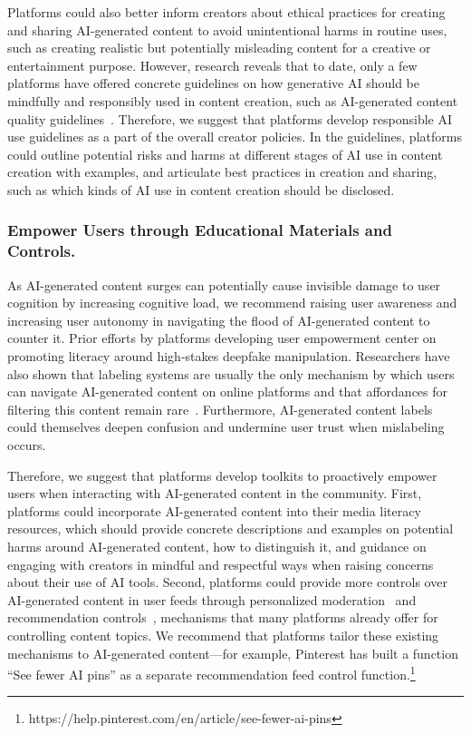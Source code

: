 Platforms could also better inform creators about ethical practices for creating and sharing AI-generated content to avoid unintentional harms in routine uses, such as creating realistic but potentially misleading content for a creative or entertainment purpose. %
However, research reveals that to date, only a few platforms have offered concrete guidelines on how generative AI should be mindfully and responsibly used in content creation, such as AI-generated content quality guidelines~\cite{gao2026governance}. Therefore, we suggest that platforms develop responsible AI use guidelines as a part of the overall creator policies. In the guidelines, platforms could outline potential risks and harms at different stages of AI use in content creation with examples, and articulate best practices in creation and sharing, such as which kinds of AI use in content creation should be disclosed.


\subsubsection{Empower Users through Educational Materials and Controls.} As AI-generated content surges can potentially cause invisible damage to user cognition by increasing cognitive load, we recommend raising user awareness and increasing user autonomy in navigating the flood of AI-generated content to counter it. Prior efforts by platforms developing user empowerment center on promoting literacy around high-stakes deepfake manipulation. Researchers have also shown that labeling systems are usually the only mechanism by which users can navigate AI-generated content on online platforms and that affordances for filtering this content remain rare~\cite{gao2026governance}. Furthermore, AI-generated content labels could themselves deepen confusion and undermine user trust when mislabeling occurs.

Therefore, we suggest that platforms develop toolkits to proactively empower users when interacting with AI-generated content in the community. First, platforms could incorporate AI-generated content into their media literacy resources, which should provide concrete descriptions and examples on potential harms around AI-generated content, how to distinguish it, and guidance on engaging with creators in mindful and respectful ways when raising concerns about their use of AI tools. Second, platforms could provide more controls over AI-generated content in user feeds through personalized moderation~\cite{jhaver2023personalizing} and recommendation controls~\cite{li2025beyond}, mechanisms that many platforms already offer for controlling content topics. We recommend that platforms tailor these existing mechanisms to AI-generated content---for example, Pinterest has built a function ``See fewer AI pins'' as a separate recommendation feed control function.\footnote{https://help.pinterest.com/en/article/see-fewer-ai-pins}

